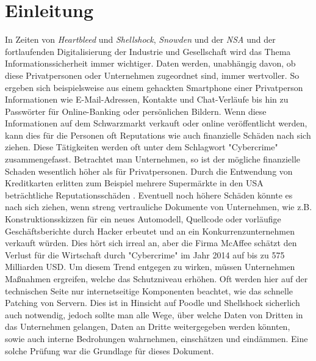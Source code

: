 \chapter{Einleitung}
In Zeiten von \textit{Heartbleed}\cite{Heartbleed} und  \textit{Shellshock}\cite{Shellshock}, \textit{Snowden} und der \textit{NSA}\cite{Snowden} und der fortlaufenden Digitalisierung der Industrie und Gesellschaft wird das Thema Informationssicherheit immer wichtiger. Daten werden, unabhängig davon, ob diese Privatpersonen oder Unternehmen zugeordnet sind, immer wertvoller. So ergeben sich beispielsweise aus einem gehackten Smartphone einer Privatperson Informationen wie E-Mail-Adressen, Kontakte und Chat-Verläufe bis hin zu Passwörter für Online-Banking oder persönlichen Bildern. Wenn diese Informationen auf dem Schwarzmarkt verkauft oder online veröffentlicht werden, kann dies für die Personen oft Reputations wie auch finanzielle Schäden nach sich ziehen. Diese Tätigkeiten werden oft unter dem Schlagwort "Cybercrime" zusammengefasst. Betrachtet man Unternehmen, so ist der mögliche finanzielle Schaden wesentlich höher als für Privatpersonen. Durch die Entwendung von Kreditkarten erlitten zum Beispiel mehrere Supermärkte in den USA beträchtliche Reputationsschäden \cite{HackKreditkarten}\cite{HackKreditkarten2}. Eventuell noch höhere Schäden könnte es nach sich ziehen, wenn streng vertrauliche Dokumente von Unternehmen, wie z.B. Konstruktionsskizzen für ein neues Automodell, Quellcode oder vorläufige Geschäftsberichte durch Hacker erbeutet und an ein Konkurrenzunternehmen verkauft würden. Dies hört sich irreal an, aber die Firma McAffee schätzt den Verlust für die Wirtschaft durch "Cybercrime" im Jahr 2014 auf bis zu 575 Milliarden USD\cite{McAffee}. 
Um diesem Trend entgegen zu wirken, müssen Unternehmen Maßnahmen ergreifen, welche das Schutzniveau erhöhen. Oft werden hier auf der technischen Seite nur internetseitige Komponenten beachtet, wie das schnelle Patching von Servern. Dies ist in Hinsicht auf  Poodle und Shellshock sicherlich auch notwendig, jedoch sollte man alle Wege, über welche Daten von Dritten in das Unternehmen gelangen, Daten an Dritte weitergegeben werden könnten, sowie auch interne Bedrohungen wahrnehmen, einschätzen und eindämmen. Eine solche Prüfung war die Grundlage für dieses Dokument.